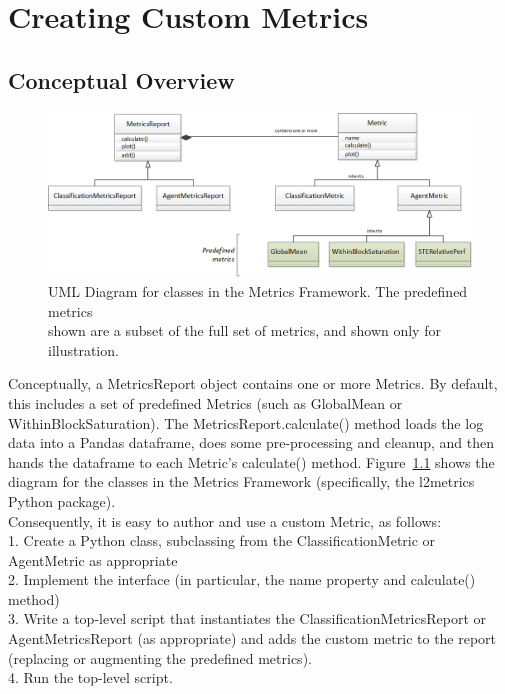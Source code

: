 \chapter{Creating Custom Metrics}\label{ch:custom_metrics}

\section{Conceptual Overview} 

\begin{figure}[h]
	\centering
	\includegraphics[width=1\columnwidth]{sections/figs/metrics_framework_uml.png}
	\caption{UML Diagram for classes in the Metrics Framework. The predefined metrics\\shown are a subset of the full set of metrics, and shown only for illustration.}
	\label{fig:umlframework}
\end{figure}

Conceptually, a MetricsReport object contains one or more Metrics. By default, this includes a set of predefined Metrics (such as GlobalMean or WithinBlockSaturation). The MetricsReport.calculate() method loads the log data into a Pandas dataframe, does some pre-processing and cleanup, and then hands the dataframe to each Metric’s calculate() method. Figure~\ref{fig:umlframework} shows the diagram for the classes in the Metrics Framework (specifically, the l2metrics Python package).\\[0.2in]

Consequently, it is easy to author and use a custom Metric, as follows:\\[0.1in]
    1. Create a Python class, subclassing from the ClassificationMetric or AgentMetric as appropriate\\
    2. Implement the interface (in particular, the name property and calculate() method)\\
    3. Write a top-level script that instantiates the ClassificationMetricsReport or AgentMetricsReport (as appropriate) and adds the custom metric to the report (replacing or augmenting the predefined metrics).\\
    4. Run the top-level script.\\[0.1in]
\iffalse
